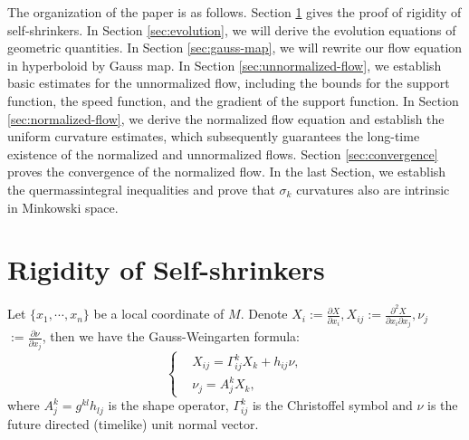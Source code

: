 \documentclass[reqno]{amsart}
\theoremstyle{remark}
\newcommand{\pd}[2]{\frac{\partial {#1}}{\partial {#2}}}
\theoremstyle{definition}
\numberwithin{equation}{section}
\begin{document}

The organization of the paper is as follows. Section \ref{sec:rigidity} gives the proof of rigidity of self-shrinkers. In Section \ref{sec:evolution}, we will derive the evolution equations of geometric quantities. In Section \ref{sec:gauss-map}, we will rewrite our flow equation in hyperboloid by Gauss map. In Section \ref{sec:unnormalized-flow}, we establish basic estimates for the unnormalized flow, including the bounds for the support function, the speed function, and the gradient of the support function. In Section \ref{sec:normalized-flow}, we derive the normalized flow equation and establish the uniform curvature estimates, which subsequently guarantees the long-time existence of the normalized and unnormalized flows. Section \ref{sec:convergence} proves the convergence of the normalized flow. In the last Section, we establish the quermassintegral inequalities and prove that $\sigma_k$ curvatures also are intrinsic in Minkowski space.


\section{Rigidity of Self-shrinkers}\label{sec:rigidity}


Let \(\{x_1,\cdots,x_n\}\) be a local coordinate of \(M\). Denote \(X_i := \pd{X}{x_i}, X_{ij} := \frac{\partial^2 X}{\partial x_i \partial x_j}, \nu_j \) \(:= \pd{\nu}{x_j}\), then we have the Gauss-Weingarten formula: 
\begin{equation}\label{eq:GW-formula}
    \left\{
    \begin{aligned}
    &X_{ij} = \Gamma_{ij}^k X_k + h_{ij}\nu, \\
    &\nu_j = A_j^k X_k, 
    \end{aligned}
    \right.
\end{equation}
where \(A_j^k = g^{kl}h_{lj}\) is the shape operator,   $\Gamma_{ij}^k$ is the Christoffel symbol and \(\nu\) is the future directed (timelike) unit normal vector.  
\end{document}
